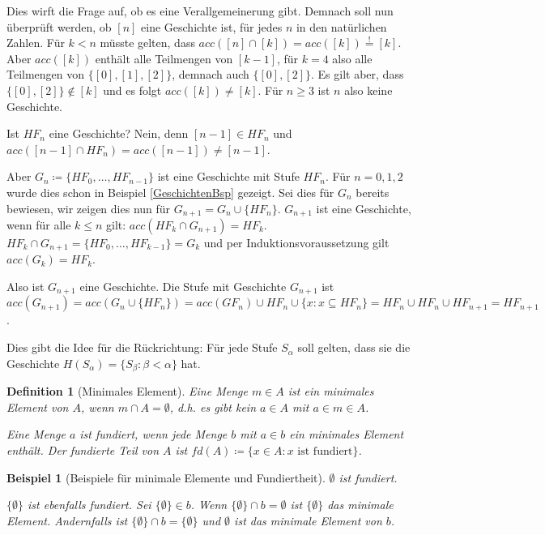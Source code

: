 \documentclass[german]{article}
\theoremstyle{break}
\newtheorem{example}{Beispiel}[section]
\theoremstyle{def_style}
\newtheorem{definition}{Definition}[section]
\theoremstyle{def_style}
\theoremstyle{lemma_style}
\begin{document}
Dies wirft die Frage auf, ob es eine Verallgemeinerung gibt. Demnach soll nun überprüft werden, ob $[n]$ eine Geschichte ist, für jedes $n$ in den natürlichen Zahlen. Für $k<n$ müsste gelten, dass $acc([n]\cap[k])=acc([k])\stackrel{!}{=}[k]$. 
Aber $acc([k])$ enthält alle Teilmengen von $[k-1]$, für $k=4$ also alle Teilmengen von $\{[0],[1],[2]\}$, demnach auch $\{[0], [2]\}$. Es gilt aber, dass $\{[0],[2]\}\notin [k]$ und es folgt $acc([k])\neq[k]$. Für $n \geq 3$ ist $n$ also keine Geschichte.

Ist $HF_n$ eine Geschichte? Nein, denn $[n-1]\in HF_n$ und $acc([n-1]\cap HF_n)=acc([n-1])\neq[n-1]$.

Aber $G_n\coloneqq\{HF_0,\dots,HF_{n-1}\}$ ist eine Geschichte mit Stufe $HF_n$. Für $n=0,1,2$ wurde dies schon in Beispiel \ref{GeschichtenBsp} gezeigt. Sei dies für $G_n$ bereits bewiesen, wir zeigen dies nun für $G_{n+1}=G_n\cup\{HF_n\}$.
$G_{n+1}$ ist eine Geschichte, wenn für alle $k \leq n$ gilt: $acc(HF_k\cap G_{n+1})=HF_k$.
$HF_k \cap G_{n+1} = \{HF_0,\dots,HF_{k-1}\}=G_k$ und per Induktionsvoraussetzung gilt $acc(G_k)=HF_k$.

Also ist $G_{n+1}$ eine Geschichte. Die Stufe mit Geschichte $G_{n+1}$ ist $acc(G_{n+1})=acc(G_n\cup \{HF_n\})=acc(GF_n)\cup HF_n \cup \{x : x\subseteq HF_n\}=HF_n\cup HF_n \cup HF_{n+1} = HF_{n+1}$.

Dies gibt die Idee für die Rückrichtung: Für jede Stufe $S_\alpha$ soll gelten, dass sie die Geschichte $H(S_\alpha)=\{S_\beta : \beta < \alpha\}$ hat.

\begin{definition}[Minimales Element]
	Eine Menge $m\in A$ ist ein \textit{minimales Element} von $A$, wenn $m\cap A=\emptyset$, d.h. es gibt kein $a\in A$ mit $a\in m \in A$.
	
	Eine Menge $a$ ist fundiert, wenn jede Menge $b$ mit $a\in b$ ein minimales Element enthält. Der fundierte Teil von $A$ ist $fd(A)\coloneqq\{x\in A : x \text{ ist fundiert}\}$.
\end{definition}

\begin{example}[Beispiele für minimale Elemente und Fundiertheit]
	$\emptyset$ ist fundiert.
	
	$\{\emptyset\}$ ist ebenfalls fundiert. Sei $\{\emptyset\}\in b$. Wenn $\{\emptyset\}\cap b =\emptyset$ ist $\{\emptyset\}$ das minimale Element. Andernfalls ist $\{\emptyset\}\cap b=\{\emptyset\}$ und $\emptyset$ ist das minimale Element von $b$.
\end{example}
\end{document}

